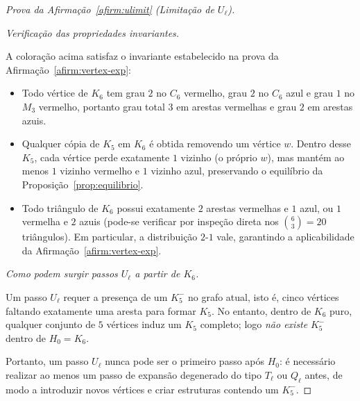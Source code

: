 \documentclass[reqno, 12pt]{amsart}
\numberwithin{equation}{section}
\theoremstyle{plain}
\theoremstyle{definition}
\begin{document}
\begin{proof}[Prova da Afirmação~\ref{afirm:ulimit} (Limitação de $U_\ell$)]
\begin{center}
\end{center}

\medskip
\noindent\textit{Verificação das propriedades invariantes.}

A coloração acima satisfaz o invariante estabelecido na prova da
Afirmação~\ref{afirm:vertex-exp}:

\begin{itemize}
  \item Todo vértice de $K_6$ tem grau $2$ no $C_6$ vermelho, grau $2$ no $C_6$ azul
        e grau $1$ no $M_3$ vermelho, portanto grau total $3$ em arestas vermelhas e
        grau $2$ em arestas azuis.

  \item Qualquer cópia de $K_5$ em $K_6$ é obtida removendo um vértice $w$.
        Dentro desse $K_5$, cada vértice perde exatamente $1$ vizinho (o próprio $w$),
        mas mantém ao menos $1$ vizinho vermelho e $1$ vizinho azul, preservando o
        equilíbrio da Proposição~\ref{prop:equilibrio}.

  \item Todo triângulo de $K_6$ possui exatamente $2$ arestas vermelhas e $1$ azul,
        ou $1$ vermelha e $2$ azuis (pode-se verificar por inspeção direta nos
        $\binom{6}{3} = 20$ triângulos). Em particular, a distribuição $2$-$1$ vale,
        garantindo a aplicabilidade da Afirmação~\ref{afirm:vertex-exp}.
\end{itemize}

\medskip
\noindent\textit{Como podem surgir passos $U_\ell$ a partir de $K_6$.}

Um passo $U_\ell$ requer a presença de um $K_5^-$ no grafo atual, isto é, cinco
vértices faltando exatamente uma aresta para formar $K_5$.
No entanto, dentro de $K_6$ puro, qualquer conjunto de $5$ vértices induz um $K_5$
completo; logo \emph{não existe} $K_5^-$ dentro de $H_0 = K_6$.

Portanto, um passo $U_\ell$ nunca pode ser o primeiro passo após $H_0$: é
necessário realizar ao menos um passo de expansão degenerado do tipo $T_\ell$ ou
$Q_\ell$ antes, de modo a introduzir novos vértices e criar estruturas contendo um $K_5^-$.


\end{proof}
\end{document}
